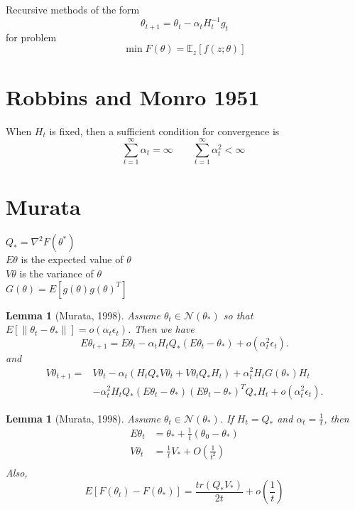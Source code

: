 \documentclass[12pt]{article}
\newtheorem{lem}[theorem]{Lemma}
\begin{document}
	Recursive methods of the form
	\[
		\theta_{t+1}= \theta_t - \alpha_t H_t^{-1} g_t 
	\]
	for problem 
	\begin{equation*}
		\label{prob}
		\min F(\theta) = \mathbb{E}_{z}[ f(z;\theta)]
	\end{equation*}
	
	\section{Robbins and Monro 1951}
	When $H_t$ is fixed, then a sufficient condition for convergence is 
	\[
	\sum_{t=1}^{\infty} \alpha_t = \infty \qquad \sum_{t=1}^{\infty} \alpha_t^2 < \infty \
	\]
	\section{Murata}
	$Q_\ast = \nabla^2 F(\theta^*) $ \\
	$E\theta$ is the expected value of $\theta$ \\
	$V\theta$ is the variance of $\theta$ \\
	$G(\theta) = E[g(\theta) g(\theta)^T]$
	\begin{lem}[Murata, 1998]
	\label{lemm:murat2}
	Assume $\theta_t\in\mathcal{N}(\theta_\ast)$ so that $E[\|\theta_t-\theta_\ast\|]=
	o(\alpha_t\epsilon_t)$.  Then we have
	\[
	 E\theta_{t+1} = E\theta_t - \alpha_t H_t Q_\ast (E\theta_t - \theta_\ast) + o(\alpha_t^2\epsilon_t).
	\]
	and
	\begin{align*}
	 V\theta_{t+1} = & V\theta_t - \alpha_t (H_tQ_\ast V\theta_t + V\theta_tQ_\ast H_t) + \alpha_t^2H_tG(\theta_\ast)H_t\\ 
	                       & -\alpha_t^2H_tQ_\ast(E\theta_t-\theta_\ast)(E\theta_t-\theta_\ast)^TQ_\ast H_t + o(\alpha_t^2\epsilon_t).
	\end{align*}
	\end{lem}

		\begin{lem}[Murata, 1998]
		\label{lemm:murat2}
		Assume $\theta_t\in\mathcal{N}(\theta_\ast)$. If $H_t = Q_\ast$ and  $\alpha_t = \frac{1}{t}$, then
		\begin{align*}
			E\theta_{t} &= \theta_\ast + \frac{1}{t}(\theta_0-\theta_\ast)\\
			V\theta_{t} &=\frac{1}{t}V_\ast + O(\frac{1}{t^2})\\	
		\end{align*}
		Also, 
		\[
			E[F(\theta_t) - F(\theta_\ast)] = \frac{tr(Q_\ast V_\ast)}{2t} + o(\frac{1}{t})
		\]
		\end{lem}
		
\end{document}
